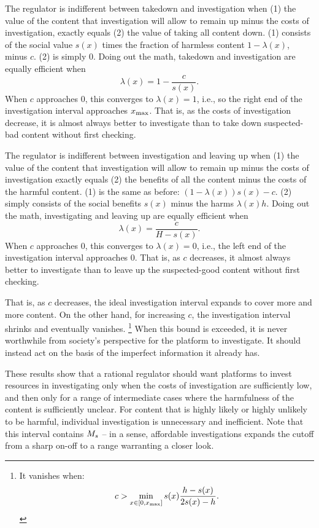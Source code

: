 
The regulator is indifferent between takedown and investigation when (1) the value of the content that investigation will allow to remain up minus the costs of investigation, exactly equals (2) the value of taking all content down. (1) consists of the social value $s(x)$ times the fraction of harmless content $1 - \lambda(x)$,  minus $c$. (2) is simply $0$. Doing out the math, takedown and investigation are equally efficient when 
 \begin{equation*}\lambda(x) = 1 - \frac{c}{s(x)}.\end{equation*} When $c$ approaches $0$, this converges to $\lambda(x) = 1$, i.e., so the right end of the investigation interval approaches $x_{\text{max}}$. That is, as the costs of investigation decrease, it is almost always better to investigate than to take down suspected-bad content without first checking.

The regulator is indifferent between investigation and leaving up when (1) the value of the content that investigation will allow to remain up minus the costs of investigation exactly equals (2) the benefits of all the content minus the costs of the harmful content. (1) is the same as before: $(1 - \lambda(x))s(x) - c$. (2) simply consists of the social benefits $s(x)$ minus the harms $\lambda(x)h$. Doing out the math, investigating and leaving up are equally efficient when 
\begin{equation*}\lambda(x) = \frac{c}{H - s(x)}.\end{equation*} When $c$ approaches $0$, this converges to $\lambda(x) = 0$, i.e., the left end of the investigation interval approaches $0$. That is, as $c$ decreases, it almost always better to investigate than to leave up the suspected-good content without first checking. 

That is, as $c$ decreases, the ideal investigation interval expands to cover more and more content. On the other hand, for increasing $c$, the investigation interval shrinks and eventually vanishes. \footnote{It vanishes when:
\begin{equation*}
c > \min_{x \in [0, x_{\text{max}}]} s(x)\frac{h - s(x)}{2s(x) - h}.
\end{equation*}}
When this bound is exceeded, it is never worthwhile from society's perspective for the platform to investigate. It should instead act on the basis of the imperfect information it already has.

These results show that a rational regulator should want platforms to invest resources in investigating only when the costs of investigation are sufficiently low, and then only for a range of intermediate cases where the harmfulness of the content is sufficiently unclear. For content that is highly likely or highly unlikely to be harmful, individual investigation is unnecessary and inefficient. Note that this interval contains $M_s$ -- in a sense, affordable investigations expands the cutoff from a sharp on-off to a range warranting a closer look.

